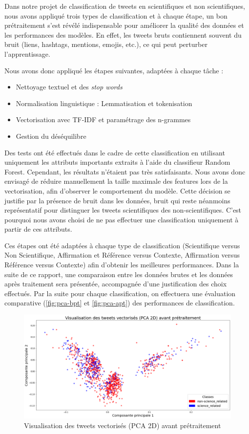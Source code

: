 Dans notre projet de classification de tweets en scientifiques et non scientifiques, nous avons appliqué trois types de classification et à chaque étape, un bon prétraitement s’est révélé indispensable pour améliorer la qualité des données et les performances des modèles.
En effet, les tweets bruts contiennent souvent du bruit (liens, hashtags, mentions, emojis, etc.), ce qui peut perturber l’apprentissage.

Nous avons donc appliqué les étapes suivantes, adaptées à chaque tâche :
\begin{itemize}
    \item Nettoyage textuel et des \textit{stop words}
    \item Normalisation linguistique : Lemmatisation et tokenisation
    \item Vectorisation avec TF-IDF et paramétrage des n-grammes
    \item Gestion du déséquilibre
\end{itemize}

Des tests ont été effectués dans le cadre de cette classification en utilisant uniquement les attributs importants extraits à l’aide du classifieur Random Forest.
Cependant, les résultats n’étaient pas très satisfaisants.
Nous avons donc envisagé de réduire manuellement la taille maximale des features lors de la vectorisation, afin d’observer le comportement du modèle.
Cette décision se justifie par la présence de bruit dans les données, bruit qui reste néanmoins représentatif pour distinguer les tweets scientifiques des non-scientifiques.
C’est pourquoi nous avons choisi de ne pas effectuer une classification uniquement à partir de ces attributs.

Ces étapes ont été adaptées à chaque type de classification (Scientifique versus Non Scientifique, Affirmation et Référence versus Contexte, Affirmation versus Référence versus Contexte) afin d’obtenir les meilleures performances.
Dans la suite de ce rapport, une comparaison entre les données brutes et les données après traitement sera présentée, accompagnée d’une justification des choix effectués.
Par la suite pour chaque classification, on effectuera une évaluation comparative (\autoref{fig:pca-bpt} et \autoref{fig:pca-apt}) des performances de classification.

\begin{figure}[H]
    \centering
    \includegraphics[width=\textwidth]{images/PCA-BPT}
    \caption{Visualisation des tweets vectorisés (PCA 2D) avant prétraitement}
    \label{fig:pca-bpt}
\end{figure}


